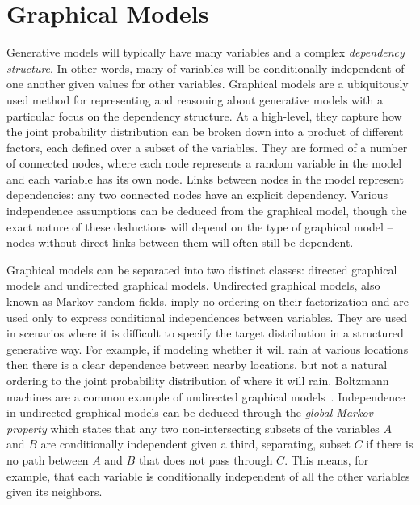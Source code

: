 
\section{Graphical Models}
\label{sec:bayes:paradigm:graph}

Generative models will typically have many variables and a complex \emph{dependency structure}.
In other words, many of variables will be conditionally independent of one another given values for
other variables.  Graphical models are a ubiquitously used method for representing and reasoning
about generative models with a particular focus on the dependency structure.  At a high-level, they
capture how the joint probability distribution can be broken down into a product of different factors, 
each defined over
a subset of the variables.  They are formed of a number of connected nodes, where each node
represents a random variable in the model and each variable has its own node.  Links between nodes in
the model represent dependencies: any two connected nodes have an explicit dependency.
Various independence assumptions can be deduced from the graphical model, though the exact nature
of these deductions will depend on the type of graphical model -- nodes without direct links
between them will often still be dependent.

Graphical models can be separated into two distinct classes: directed graphical
models and undirected graphical models.  Undirected graphical models, also known as Markov random
fields, imply no ordering on their factorization and are used only to express conditional independences
between variables.  They are used in scenarios where it is difficult to specify the target distribution in a
structured generative way.  For example, if modeling whether it will rain at various locations then there
is a clear dependence between nearby locations, but not a natural ordering to the joint probability
distribution of where it will rain.  Boltzmann machines are a common example of undirected graphical
models~\citep{ackley1985learning}.  Independence in undirected graphical models can be deduced
through the \emph{global Markov property} which states that any two non-intersecting subsets of the 
variables $A$ and $B$ are
conditionally independent given a third, separating, subset $C$ if there is no path between $A$ and
$B$ that does not pass through $C$.  This means, for example, that each variable is conditionally
independent of all the other variables given its neighbors.

